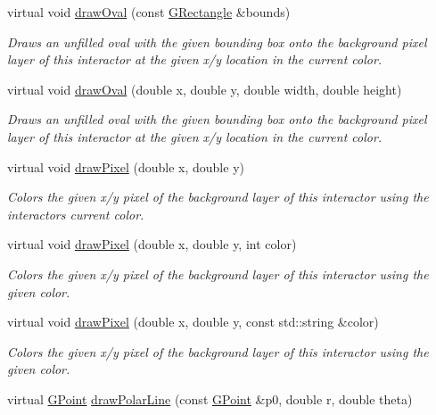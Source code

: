 \begin{DoxyCompactItemize}
virtual void \mbox{\hyperlink{classGDrawingSurface_a8adc13027efe311b4a6a715205b8bc46}{draw\+Oval}} (const \mbox{\hyperlink{structGRectangle}{G\+Rectangle}} \&bounds)
\begin{DoxyCompactList}\small\item\em Draws an unfilled oval with the given bounding box onto the background pixel layer of this interactor at the given x/y location in the current color. \end{DoxyCompactList}\item 
virtual void \mbox{\hyperlink{classGDrawingSurface_aa5b1cf902e578907da3c63060686354e}{draw\+Oval}} (double x, double y, double width, double height)
\begin{DoxyCompactList}\small\item\em Draws an unfilled oval with the given bounding box onto the background pixel layer of this interactor at the given x/y location in the current color. \end{DoxyCompactList}\item 
virtual void \mbox{\hyperlink{classGDrawingSurface_a0c1e2923d8d163d62d0896d8c5cfa191}{draw\+Pixel}} (double x, double y)
\begin{DoxyCompactList}\small\item\em Colors the given x/y pixel of the background layer of this interactor using the interactor\textquotesingle{}s current color. \end{DoxyCompactList}\item 
virtual void \mbox{\hyperlink{classGDrawingSurface_a3a64eb6383e601be8438e9c71643c432}{draw\+Pixel}} (double x, double y, int color)
\begin{DoxyCompactList}\small\item\em Colors the given x/y pixel of the background layer of this interactor using the given color. \end{DoxyCompactList}\item 
virtual void \mbox{\hyperlink{classGDrawingSurface_a20abc26a94b7eb310e34abf668e0f5f4}{draw\+Pixel}} (double x, double y, const std\+::string \&color)
\begin{DoxyCompactList}\small\item\em Colors the given x/y pixel of the background layer of this interactor using the given color. \end{DoxyCompactList}\item 
virtual \mbox{\hyperlink{structGPoint}{G\+Point}} \mbox{\hyperlink{classGDrawingSurface_af70cce1e4f708f1ed5b6f29cecb660e7}{draw\+Polar\+Line}} (const \mbox{\hyperlink{structGPoint}{G\+Point}} \&p0, double r, double theta)

\end{DoxyCompactItemize}
